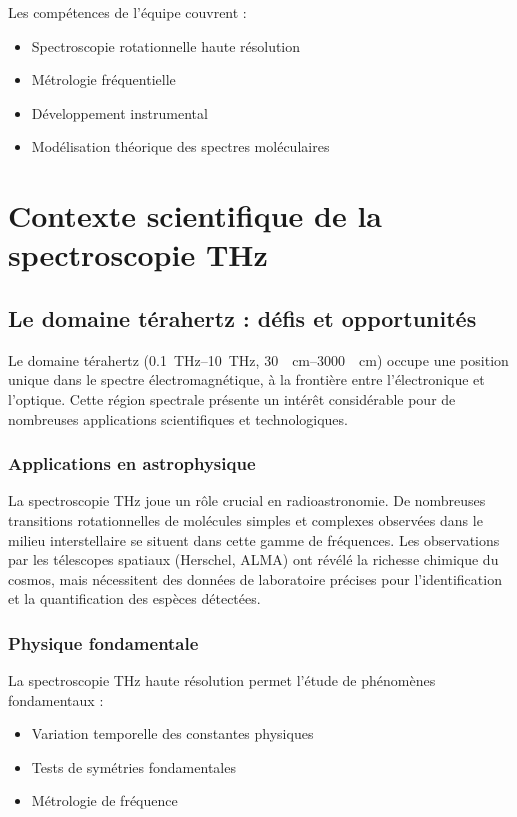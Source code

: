 Les compétences de l'équipe couvrent :
\begin{itemize}
    \item Spectroscopie rotationnelle haute résolution
    \item Métrologie fréquentielle
    \item Développement instrumental
    \item Modélisation théorique des spectres moléculaires
\end{itemize}

\section{Contexte scientifique de la spectroscopie THz}

\subsection{Le domaine térahertz : défis et opportunités}

Le domaine térahertz (\SIrange{0.1}{10}{\THz}, \SIrange{30}{3000}{\per\centi\meter}) occupe une position unique dans le spectre électromagnétique, à la frontière entre l'électronique et l'optique. Cette région spectrale présente un intérêt considérable pour de nombreuses applications scientifiques et technologiques.

\subsubsection{Applications en astrophysique}

La spectroscopie THz joue un rôle crucial en radioastronomie. De nombreuses transitions rotationnelles de molécules simples et complexes observées dans le milieu interstellaire se situent dans cette gamme de fréquences. Les observations par les télescopes spatiaux (Herschel, ALMA) ont révélé la richesse chimique du cosmos, mais nécessitent des données de laboratoire précises pour l'identification et la quantification des espèces détectées.

\subsubsection{Physique fondamentale}

La spectroscopie THz haute résolution permet l'étude de phénomènes fondamentaux :
\begin{itemize}
    \item Variation temporelle des constantes physiques
    \item Tests de symétries fondamentales
    \item Métrologie de fréquence
\end{itemize}

